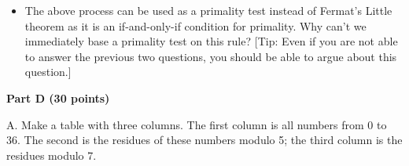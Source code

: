 \documentclass{article}
\begin{document}
\begin{itemize}
\item The above process can be used as a primality test instead of
  Fermat's Little theorem as it is an if-and-only-if condition for
  primality. Why can't we immediately base a primality test on this
  rule? [Tip: Even if you are not able to answer the previous two
    questions, you should be able to argue about this question.]\\


\end{itemize}

\begin{center}
{\bf Part D (30 points)}
\end{center}



\noindent A. Make a table with three columns. The first column is all numbers
from 0 to 36. The second is the residues of these numbers modulo 5;
the third column is the residues modulo 7.\\
\end{document}
